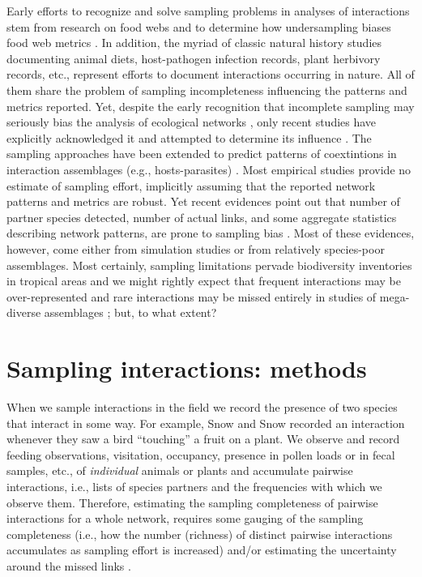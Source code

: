 \documentclass[12pt]{article}
\begin{document}
Early efforts to recognize and solve sampling problems in analyses of interactions stem from research on food webs and to determine how undersampling biases food web metrics \citep{Martinez:1991aa,Cohen:1993aa,Martinez:1993ti,Bersier:2002p9371,Brose:2003wv,BanasekRichter:2004ik,Wells:2012dy}. In addition, the myriad of classic natural history studies documenting animal diets, host-pathogen infection records, plant herbivory records, etc., represent efforts to document interactions occurring in nature. All of them share the problem of sampling incompleteness influencing the patterns and metrics reported. Yet, despite the early recognition that incomplete sampling may seriously bias the analysis of ecological networks \citep{E31/2562}, only recent studies have explicitly acknowledged it and attempted to determine its influence \citep{Ollerton:2002jw,Nielsen:2007,Vazquez:2009p82,Gibson:2011eh,Olesen:2011a,Chacoff:2012,RiveraHutinel:2012vn,Olito:2014gc,Bascompte:2014to,Vizentin-Bugoni:2014hc,Frund:2015ii}. The sampling approaches have been extended to predict patterns of coextintions in interaction assemblages (e.g., hosts-parasites) \citep{Colwell:2012fc}. Most empirical studies provide no estimate of sampling effort, implicitly assuming that the reported network patterns and metrics are robust. Yet recent evidences point out that number of partner species detected, number of actual links, and some aggregate statistics describing network patterns, are prone to sampling bias \citep{Nielsen:2007,Dorado:2011cf,Olesen:2011a,Chacoff:2012,RiveraHutinel:2012vn,Olito:2014gc,Frund:2015ii}. Most of these evidences, however, come either from simulation studies \citep{Frund:2015ii} or from relatively species-poor assemblages. Most certainly, sampling limitations pervade biodiversity inventories in tropical areas \citep{Coddington:2009fi} and we might rightly expect that frequent interactions may be over-represented and rare interactions may be missed entirely in studies of mega-diverse assemblages \citep{Bascompte:2014to}; but, to what extent? 

\section*{Sampling interactions: methods}
\label{samplinginteractions:methods}
When we sample interactions in the field we record the presence of two species that interact in some way. For example, Snow and Snow\citeyearpar{Snow:1988iu} recorded an interaction whenever they saw a bird ``touching'' a fruit on a plant. We observe and record feeding observations, visitation, occupancy, presence in pollen loads or in fecal samples, etc., of \emph{individual} animals or plants and accumulate pairwise interactions, i.e., lists of species partners and the frequencies with which we observe them. Therefore, estimating the sampling completeness of pairwise interactions for a whole network, requires some gauging of the sampling completeness (i.e., how the number (richness) of distinct pairwise interactions accumulates as sampling effort is increased) and/or estimating the uncertainty around the missed links \citep{Wells:2012dy}. 
\end{document}
